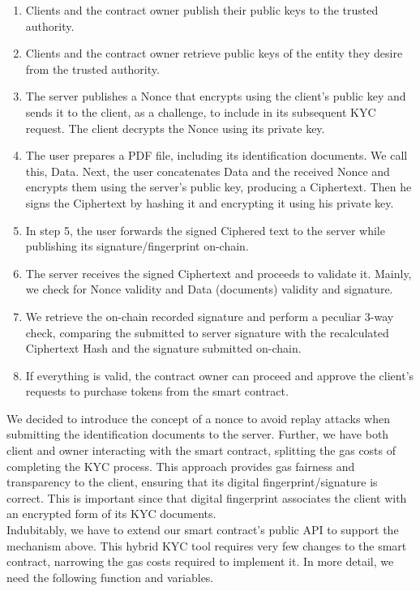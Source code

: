 \documentclass[12pt,a4paper]{article}
\begin{document}
\begin{enumerate}
    \item Clients and the contract owner publish their public keys to the trusted authority.
    \item Clients and the contract owner retrieve public keys of the entity they
    desire from the trusted authority.
    \item The server publishes a Nonce that encrypts using the client's public
    key and sends it to the client, as a challenge, to include in its subsequent
    KYC request. The client decrypts the Nonce using its private key.
    \item The user prepares a PDF file, including its identification documents.
    We call this, Data. Next, the user concatenates Data and the received Nonce
    and encrypts them using the server's public key, producing a Ciphertext.
    Then he signs the Ciphertext by hashing it and encrypting it using his
    private key.
    \item In step 5, the user forwards the signed Ciphered text to the server
    while publishing its signature/fingerprint on-chain.
    \item The server receives the signed Ciphertext and proceeds to validate it.
    Mainly, we check for Nonce validity and Data (documents) validity and
    signature.
    \item We retrieve the on-chain recorded signature and perform a peculiar
    3-way check, comparing the submitted to server signature with the
    recalculated Ciphertext Hash and the signature submitted on-chain.
    \item If everything is valid, the contract owner can proceed and approve the
    client's requests to purchase tokens from the smart contract. 
\end{enumerate}

We decided to introduce the concept of a nonce to avoid replay attacks when
submitting the identification documents to the server. Further, we have both
client and owner interacting with the smart contract, splitting the gas costs of
completing the KYC process. This approach provides gas fairness and transparency
to the client, ensuring that its digital fingerprint/signature is correct. This
is important since that digital fingerprint associates the client with an
encrypted form of its KYC documents.\\

Indubitably, we have to extend our smart contract's public  API to support the
mechanism above. This hybrid KYC tool requires very few changes to the smart
contract, narrowing the gas costs required to implement it. In more detail, we
need the following function and variables.\\
\end{document}

